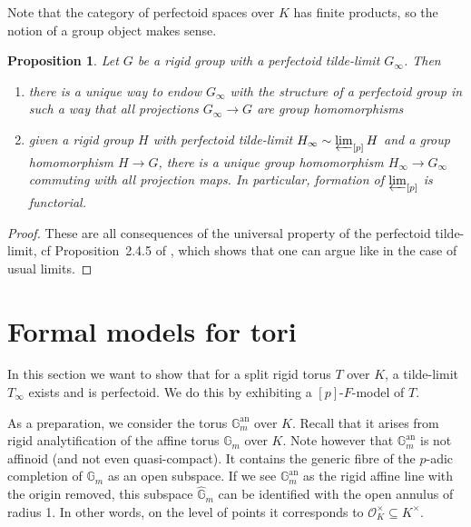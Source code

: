\documentclass[10pt,oneside]{amsart}
\newtheorem{proposition}[theorem]{Proposition}
\theoremstyle{definition}
\begin{document}
			Note that the category of perfectoid spaces over $K$ has finite products, so the notion of a group object makes sense. 
	
	\begin{proposition}\label{perfectoid tilde-limit is perfectoid group in a functorial way}
		Let $G$ be a rigid group with a perfectoid tilde-limit $G_\infty$. Then
		\begin{enumerate}
		\item  there is a unique way to endow $G_\infty$ with the structure of a perfectoid group in such a way that all projections $G_\infty\rightarrow G$ are group homomorphisms
		\item given a rigid group $H$ with perfectoid tilde-limit $H_\infty\sim\varprojlim_{[p]}H$ and a group homomorphism $H\rightarrow G$, there is a unique group homomorphism $H_\infty\rightarrow G_\infty$
		commuting with all projection maps. In particular, formation of $\varprojlim_{[p]}$ is functorial.
	\end{enumerate}
	\end{proposition}
	\begin{proof}
		These are all consequences of the universal property of the perfectoid tilde-limit, cf Proposition~2.4.5 of \cite{SW}, which shows that one can argue like in the case of usual limits.
	\end{proof}


	\section{Formal models for tori}
	
	In this section we want to show that for a split rigid torus $T$ over $K$, a tilde-limit $T_\infty$ exists and is perfectoid. We do this by exhibiting a $[p]$-$F$-model of $T$.
	
	As a preparation, we consider the torus $\mathbb G_m^{\operatorname{an}}$ over $K$. Recall that it arises from rigid analytification of the affine torus $\mathbb G_m$ over $K$. Note however that $\mathbb G_m^{\operatorname{an}}$ is not affinoid (and not even quasi-compact). It contains the generic fibre of the $p$-adic completion of $\mathbb G_m$ as an open subspace. If we see $\mathbb G_m^{\operatorname{an}}$ as the rigid affine line with the origin removed, this subspace $\widehat{\mathbb G}_m$ can be identified with the open annulus of radius 1. In other words, on the level of points it corresponds to $\mathcal O_K^\times \subseteq K^\times$.
	
\end{document}
